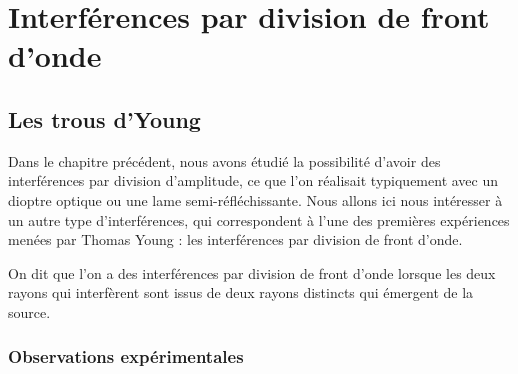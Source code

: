 \documentclass[11pt,fleqn]{book} %
\begin{document}










\setcounter{chapter}{9}

\chapter{Interférences par division de front d'onde}

\section{Les trous d'Young}

Dans le chapitre précédent, nous avons étudié la possibilité d'avoir des interférences par division d'amplitude, ce que l'on réalisait typiquement avec un dioptre optique ou une lame semi-réfléchissante. Nous allons ici nous intéresser à un autre type d'interférences, qui correspondent à l'une des premières expériences menées par Thomas Young : les interférences par division de front d'onde.

\begin{definition}
	On dit que l'on a des interférences par division de front d'onde lorsque les deux rayons qui interfèrent sont issus de deux rayons distincts qui émergent de la source.
\end{definition}

\subsection{Observations expérimentales}
\end{document}
